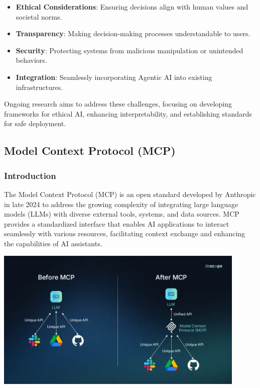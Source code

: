\begin{itemize}
    \item \textbf{Ethical Considerations}: Ensuring decisions align with human values and societal norms.
    \item \textbf{Transparency}: Making decision-making processes understandable to users.
    \item \textbf{Security}: Protecting systems from malicious manipulation or unintended behaviors.
    \item \textbf{Integration}: Seamlessly incorporating Agentic AI into existing infrastructures.
\end{itemize}

Ongoing research aims to address these challenges, focusing on developing frameworks for ethical AI, enhancing interpretability, and establishing standards for safe deployment.

\subsection{Model Context Protocol (MCP)}

\subsubsection{Introduction}
The Model Context Protocol (MCP) is an open standard developed by Anthropic in late 2024 to address the growing complexity of integrating large language models (LLMs) with diverse external tools, systems, and data sources. MCP provides a standardized interface that enables AI applications to interact seamlessly with various resources, facilitating context exchange and enhancing the capabilities of AI assistants.

\begin{center}
    \includegraphics[width=0.9\textwidth]{Images/before_and_after_mcp.png}
     \cite{mcpBeforeAfter}
    \label{fig:mcp_before_after}
\end{center}

